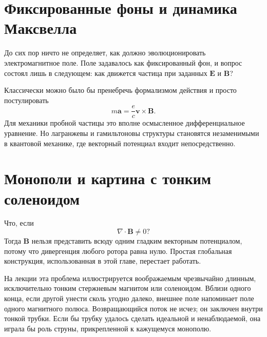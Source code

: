 \section{Фиксированные фоны и динамика Максвелла}

До сих пор ничто не определяет, как должно эволюционировать электромагнитное поле. Поле задавалось как фиксированный фон, и вопрос состоял лишь в следующем: как движется частица при заданных \(\mathbf E\) и \(\mathbf B\)?

\begin{classroomqa}
\end{classroomqa}

Классически можно было бы пренебречь формализмом действия и просто постулировать
\begin{equation}
  m\mathbf a=\frac{e}{c}\mathbf v\times\mathbf B.
\end{equation}
Для механики пробной частицы это вполне осмысленное дифференциальное уравнение. Но лагранжевы и гамильтоновы структуры становятся незаменимыми в квантовой механике, где векторный потенциал входит непосредственно.

\section{Монополи и картина с тонким соленоидом}

Что, если
\begin{equation}
  \nabla\cdot\mathbf B\neq0?
\end{equation}
Тогда \(\mathbf B\) нельзя представить всюду одним гладким векторным потенциалом, потому что дивергенция любого ротора равна нулю. Простая глобальная конструкция, использованная в этой главе, перестает работать.

На лекции эта проблема иллюстрируется воображаемым чрезвычайно длинным, исключительно тонким стержневым магнитом или соленоидом. Вблизи одного конца, если другой унести сколь угодно далеко, внешнее поле напоминает поле одного магнитного полюса. Возвращающийся поток не исчез; он заключен внутри тонкой трубки. Если бы трубку удалось сделать идеальной и ненаблюдаемой, она играла бы роль струны, прикрепленной к кажущемуся монополю.

